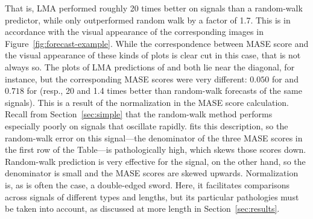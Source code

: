 That is, LMA performed roughly 20 times better on \col signals than a
random-walk predictor, while \arima only outperformed random walk
by a factor of 1.7.  This is in accordance with the visual appearance
of the corresponding images in Figure~\ref{fig:forecast-example}.
While the correspondence between MASE score and the visual appearance
of these kinds of plots is clear cut in this case, that is not always
so.  The plots of LMA predictions of \col and \svdfive both lie near
the diagonal, for instance, but the corresponding MASE scores were
very different: $0.050$ for \col and $0.718$ for \svdfive (resp., 20
and 1.4 times better than random-walk forecasts of the same signals).
This is a result of the normalization in the MASE score calculation.
Recall from Section~\ref{sec:simple} that the random-walk method
performs especially poorly on signals that oscillate rapidly.  \col
fits this description, so the random-walk error on this signal---the
denominator of the three MASE scores in the first row of the
Table---is pathologically high, which skews those scores down.
Random-walk prediction is very effective for the \svdfive signal, on
the other hand, so the denominator is small and the MASE scores are
skewed upwards.  Normalization is, as is often the case, a
double-edged sword.  Here, it facilitates comparisons across signals
of different types and lengths, but its particular pathologies must be
taken into account, as discussed at more length in
Section~\ref{sec:results}.




